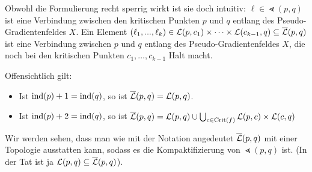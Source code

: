Obwohl die Formulierung recht sperrig wirkt ist sie doch intuitiv: 
$\ell \in \Lt (p, q)$ ist eine \glqq Verbindung\grqq{} zwischen den kritischen Punkten $p$ und $q$ 
entlang des Pseudo-Gradientenfeldes $X$. Ein Element 
$(\ell_1, ..., \ell_k) \in { \mathcal{L} } (p, c_1) \times \dots \times { \mathcal{L} } (c_{k - 1}, q) \subseteq {\overline{\mathcal{L}} } (p, q)$
ist eine \glqq Verbindung\grqq{} zwischen $p$ und $q$ entlang des Pseudo-Gradientenfeldes $X$, die noch 
bei den kritischen Punkten $c_1, \dots, c_{k - 1}$ \glqq Halt\grqq{} macht. 

Offensichtlich gilt:
\begin{itemize}
    \item Ist ${ \operatorname{ind} } (p) + 1 = { \operatorname{ind} } (q)$, so ist ${\overline{\mathcal{L}} } (p, q) = { \mathcal{L} } (p, q)$.
    \item Ist ${ \operatorname{ind} } (p) + 2 = { \operatorname{ind} } (q)$, so ist 
        ${\overline{\mathcal{L}} } (p, q) = { \mathcal{L} } (p, q) \cup \bigcup_{c \in { \operatorname{Crit} } (f)} { \mathcal{L} }(p, c) \times { \mathcal{L} }(c, q)$
\end{itemize}

Wir werden sehen, dass man wie mit der Notation angedeutet ${\overline{\mathcal{L}} } (p, q)$ mit einer Topologie ausstatten 
kann, sodass es die Kompaktifizierung von $\Lt (p, q)$ ist. (In der Tat ist ja 
${ \mathcal{L} } (p, q) \subseteq {\overline{\mathcal{L}} } (p, q)$).

